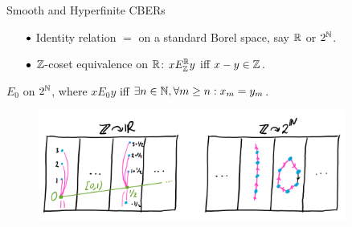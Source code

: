 \documentclass{beamer}
\begin{document}
    \begin{frame}{Smooth and Hyperfinite CBERs}
        \footnotesize{
            \vspace{-0.4in}
            \begin{example}[Smooth]
                \begin{itemize}
                    \item[\scriptsize$\bullet$] Identity relation $=$ on a standard Borel space, say $\mathbb{R}$ or $2^{\mathbb{N}}$.
                    \item[\scriptsize$\bullet$] $\mathbb{Z}$-coset equivalence on $\mathbb{R}$: $xE^{\mathbb{R}}_{\mathbb{Z}} y$ iff $x-y\in\mathbb{Z}$.
                \end{itemize}
            \end{example}

            \vspace{-0.1in}

            \begin{example}[Hyperfinite]
                $E_0$ on $2^{\mathbb{N}}$, where $xE_0y$ iff $\exists n\in\mathbb{N},\forall m\geq n:x_m=y_m$.
            \end{example}

            \vspace{-0.15in}

            \begin{figure}[h]
                \center
                \includegraphics[width=0.9\textwidth]{img/smooth_hyperfinite.png}
            \end{figure}
        }
    \end{frame}
\end{document}
